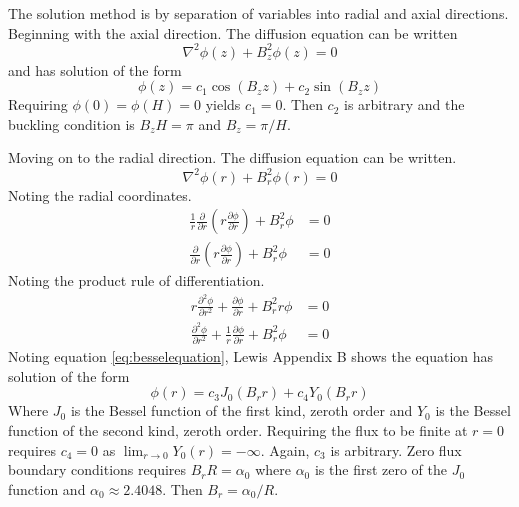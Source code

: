   The solution method is by separation of variables into radial and axial 
  directions. Beginning with the axial direction. The diffusion equation can 
  be written
  \begin{equation} \label{eq:simplediffusion}
    \nabla^2 \phi(z) + B_z^2 \phi(z) = 0
  \end{equation}
  and has solution of the form
  \begin{equation} \label{eq:cyl_axial}
    \phi(z) = c_1 \cos(B_z z) + c_2 \sin(B_z z)
  \end{equation}
  Requiring $\phi(0)=\phi(H)=0$ yields $c_1=0$. Then $c_2$ is arbitrary and 
  the buckling condition is $B_zH=\pi$ and $B_z=\pi/H$.
  
  Moving on to the radial direction. The diffusion equation can be written.
  \begin{equation}
    \nabla^2 \phi(r) + B_r^2 \phi(r) = 0
  \end{equation}
  Noting the radial coordinates.
  \begin{align}
    \frac{1}{r} \frac{\partial}{\partial r} \left( r \frac{\partial \phi}
      {\partial r} \right) + B_r^2 \phi &= 0 \\
    \frac{\partial}{\partial r} \left( r \frac{\partial \phi}{\partial r}
      \right) + B_r^2 \phi &= 0
  \end{align}
  Noting the product rule of differentiation.
  \begin{align}
    r \frac{\partial^2 \phi}{\partial r^2} + \frac{\partial \phi}
      {\partial r} + B_r^2 r \phi &= 0 \\
    \frac{\partial^2 \phi}{\partial r^2} + \frac{1}{r} \frac{\partial \phi}
      {\partial r} + B_r^2 \phi &= 0 \label{eq:besselequation}
  \end{align}
  Noting equation \eqref{eq:besselequation}, Lewis Appendix B shows the 
  equation has solution of the form
  \begin{equation} \label{eq:cyl_radial}
    \phi(r) = c_3 J_0(B_r r) + c_4 Y_0(B_r r)
  \end{equation}
  Where $J_0$ is the Bessel function of the first kind, zeroth order and $Y_0$
  is the Bessel function of the second kind, zeroth order. Requiring the flux
  to be finite at $r=0$ requires $c_4=0$ as 
  $\lim_{r\rightarrow0} Y_0(r)=-\infty$. Again, $c_3$ is arbitrary. Zero flux 
  boundary conditions requires $B_r R=\alpha_0$ where $\alpha_0$ is the first 
  zero of the $J_0$ function and $\alpha_0 \approx 2.4048$. Then 
  $B_r=\alpha_0/R$.
  
